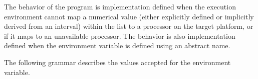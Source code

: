 The behavior of the program is implementation defined when the execution
environment cannot map a numerical value (either explicitly defined or
implicitly derived from an interval) within the  list to
a processor on the target platform, or if it maps to an unavailable processor.
The behavior is also implementation defined when the 
environment variable is defined using an abstract name.

The following grammar describes the values accepted for the 
environment variable.

\begin{bnf*}
    \\
    \\
    \\
    \\
    \\
    \\
    \\
    \\
    \\
    \\
    \\
    \\
\end{bnf*}

